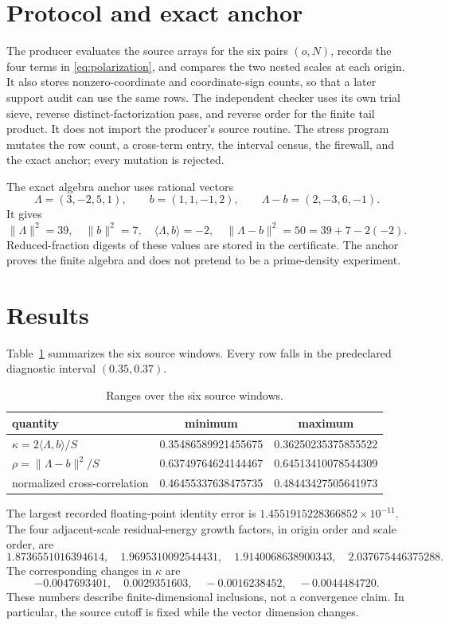 \documentclass[10pt]{article}
\begin{document}
\section{Protocol and exact anchor}

The producer evaluates the source arrays for the six pairs $(o,N)$, records
the four terms in \eqref{eq:polarization}, and compares the two nested scales
at each origin.  It also stores nonzero-coordinate and coordinate-sign
counts, so that a later support audit can use the same rows.  The independent
checker uses its own trial sieve, reverse distinct-factorization pass, and
reverse order for the finite tail product.  It does not import the producer's
source routine.  The stress program mutates the row count, a cross-term
entry, the interval census, the firewall, and the exact anchor; every
mutation is rejected.

The exact algebra anchor uses rational vectors
\[
 \Lambda=(3,-2,5,1),\qquad b=(1,1,-1,2),
 \qquad \Lambda-b=(2,-3,6,-1).
\]
It gives
\[
 \|\Lambda\|^2=39,\quad \|b\|^2=7,\quad
 \langle\Lambda,b\rangle=-2,\quad
 \|\Lambda-b\|^2=50=39+7-2(-2).
\]
Reduced-fraction digests of these values are stored in the certificate.  The
anchor proves the finite algebra and does not pretend to be a prime-density
experiment.

\section{Results}

Table~\ref{tab:range} summarizes the six source windows.  Every row falls in
the predeclared diagnostic interval $(0.35,0.37)$.
\begin{table}[ht]
\centering\small
\caption{Ranges over the six source windows.}
\label{tab:range}
\begin{tabular}{lcc}
\toprule
quantity & minimum & maximum\\
\midrule
$\kappa=2\langle\Lambda,b\rangle/S$
 & 0.35486589921455675 & 0.36250235375855522\\
$\rho=\|\Lambda-b\|^2/S$
 & 0.63749764624144467 & 0.64513410078544309\\
normalized cross-correlation
 & 0.46455337638475735 & 0.48443427505641973\\
\bottomrule
\end{tabular}
\end{table}

The largest recorded floating-point identity error is
$1.4551915228366852\times10^{-11}$.  The four adjacent-scale residual-energy
growth factors, in origin order and scale order, are
\[
 1.8736551016394614,\quad 1.9695310092544431,\quad
 1.9140068638900343,\quad 2.037675446375288.
\]
The corresponding changes in $\kappa$ are
\[
 -0.0047693401,\quad 0.0029351603,\quad
 -0.0016238452,\quad -0.0044484720.
\]
These numbers describe finite-dimensional inclusions, not a convergence
claim.  In particular, the source cutoff is fixed while the vector dimension
changes.
\end{document}
